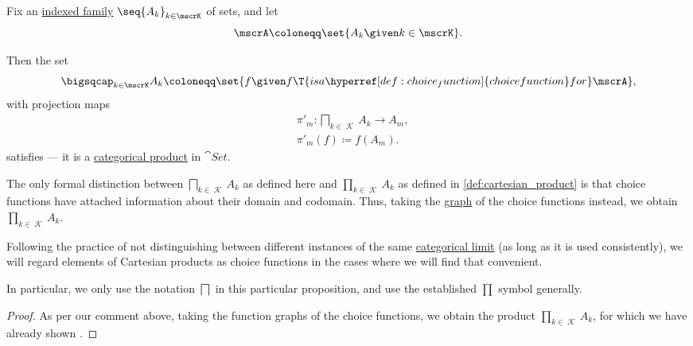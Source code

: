 \begin{proposition}\label{thm:cartesian_product_via_choice_functions}
  Fix an \hyperref[def:indexed_family]{indexed family} \( \seq{ A_k }_{k \in \mscrK} \) of sets, and let
  \begin{equation*}
    \mscrA \coloneqq \set{ A_k \given k \in \mscrK}.
  \end{equation*}

  Then the set
  \begin{equation}\label{eq:thm:cartesian_product_via_choice_functions}
    \bigsqcap_{k \in \mscrK} A_k \coloneqq \set{ f \given f \T{is a \hyperref[def:choice_function]{choice function} for} \mscrA },
  \end{equation}
  with projection maps
  \begin{equation}\label{eq:thm:cartesian_product_via_choice_functions/projection}
    \begin{aligned}
      &\pi'_m: \bigsqcap_{k \in \mscrK} A_k \to A_m, \\
      &\pi'_m(f) \coloneqq f(A_m).
    \end{aligned}
  \end{equation}
  satisfies  --- it is a \hyperref[def:categorical_product]{categorical product} in \( \hyperref[def:category_of_small_sets]{\cat{Set}} \).
\end{proposition}
\begin{comments}
  \item The only formal distinction between \( \bigsqcap_{k \in \mscrK} A_k \) as defined here and \( \prod_{k \in \mscrK} A_k \) as defined in \cref{def:cartesian_product} is that choice functions have attached information about their domain and codomain. Thus, taking the \hyperref[def:set_valued_function/graph]{graph} of the choice functions instead, we obtain \( \prod_{k \in \mscrK} A_k \).

  Following the practice of not distinguishing between different instances of the same \hyperref[def:categorical_limit]{categorical limit} (as long as it is used consistently), we will regard elements of Cartesian products as choice functions in the cases where we will find that convenient.

  In particular, we only use the notation \( \bigsqcap \) in this particular proposition, and use the established \( \prod \) symbol generally.
\end{comments}
\begin{proof}
  As per our comment above, taking the function graphs of the choice functions, we obtain the product \( \prod_{k \in \mscrK} A_k \), for which we have already shown .
\end{proof}

